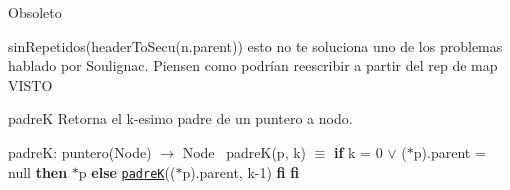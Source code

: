 \begin{DoxyRefDesc}{Obsoleto}
\item[\hyperlink{deprecated__deprecated000002}{Obsoleto}]sin\+Repetidos(header\+To\+Secu(n.\+parent)) esto no te soluciona uno de los problemas hablado por Soulignac. Piensen como podrían reescribir a partir del rep de map V\+I\+S\+TO\end{DoxyRefDesc}


\begin{DoxyParagraph}{padreK}
Retorna el k-\/esimo padre de un puntero a nodo.

padreK\+: puntero(\+Node) $\to$ Node~\newline
 padre\+K(p, k) $\equiv$ {\bfseries if} k = 0 $\lor$ ($\ast$p).parent = null {\bfseries then} $\ast$p {\bfseries else} \href{axiomas.html#padreK}{\tt padreK}(($\ast$p).parent, k-\/1) {\bfseries fi} {\bfseries fi} 
\end{DoxyParagraph}
